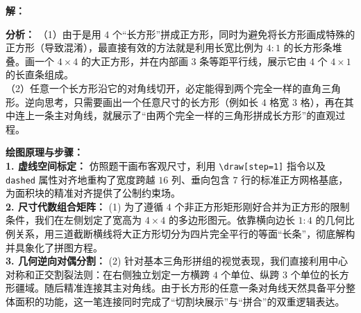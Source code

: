\vspace{0.4cm}
\textbf{解：}

\textbf{分析：}
（1）由于是用 $4$ 个“长方形”拼成正方形，同时为避免将长方形画成特殊的正方形（导致混淆），最直接有效的方法就是利用长宽比例为 $4:1$ 的长方形条堆叠。画一个 $4 \times 4$ 的大正方形，并在内部画 $3$ 条等距平行线，展示它由 $4$ 个 $4\times 1$ 的长直条组成。\\
（2）任意一个长方形沿它的对角线切开，必定能得到两个完全一样的直角三角形。逆向思考，只需要画出一个任意尺寸的长方形（例如长 $4$ 格宽 $3$ 格），再在其中连上一条主对角线，就展示了“由两个完全一样的三角形拼成长方形”的直观过程。

\vspace{0.6cm}
\begin{center}
\end{center}

\vspace{0.4cm}
{\small\color{blue!70!black}
\textbf{绘图原理与步骤：}\\
\textbf{1. 虚线空间标定：} 仿照题干画布客观尺寸，利用 \texttt{\textbackslash draw[step=1]} 指令以及 \texttt{dashed} 属性对齐地重构了宽度跨越 $16$ 列、垂向包含 $7$ 行的标准正方网格基底，为面积块的精准对齐提供了公制约束场。\\
\textbf{2. 尺寸代数组合矩阵：} (1) 为了遵循 $4$ 个非正方形矩形刚好合并为正方形的限制条件，我们在左侧划定了宽高为 $4 \times 4$ 的多边形图元。依靠横向边长 $1:4$ 的几何比例关系，用三道截断横线将大正方形切分为四片完全平行的等面“长条”，彻底解构并具象化了拼图方程。\\
\textbf{3. 几何逆向对偶分割：} (2) 针对基本三角形拼组的视觉表现，我们直接利用中心对称和正交割裂法则：在右侧独立划定一方横跨 $4$ 个单位、纵跨 $3$ 个单位的长方形疆域。随后精准连接其主对角线。由于长方形的任意一条对角线天然具备平分整体面积的功能，这一笔连接同时完成了“切割块展示”与“拼合”的双重逻辑表达。
}

\newpage
